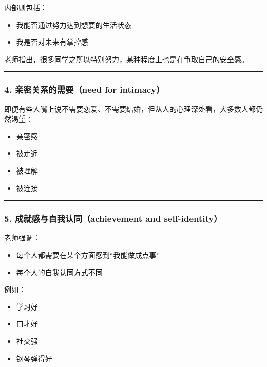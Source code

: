 \documentclass[
  chinese,
  9pt,
  a4paper,
]{ctexart}
\providecommand{\tightlist}{%
  \setlength{\itemsep}{0pt}\setlength{\parskip}{0pt}}
\begin{document}
内部则包括：

\begin{itemize}
\tightlist
\item
  我能否通过努力达到想要的生活状态
\item
  我是否对未来有掌控感
\end{itemize}

老师指出，很多同学之所以特别努力，某种程度上也是在争取自己的安全感。

\begin{center}\rule{0.5\linewidth}{0.5pt}\end{center}

\subsubsection{4. 亲密关系的需要（need for
intimacy）}\label{ux4eb2ux5bc6ux5173ux7cfbux7684ux9700ux8981need-for-intimacy}

即便有些人嘴上说不需要恋爱、不需要结婚，但从人的心理深处看，大多数人都仍然渴望：

\begin{itemize}
\tightlist
\item
  亲密感
\item
  被走近
\item
  被理解
\item
  被连接
\end{itemize}

\begin{center}\rule{0.5\linewidth}{0.5pt}\end{center}

\subsubsection{5. 成就感与自我认同（achievement and
self-identity）}\label{ux6210ux5c31ux611fux4e0eux81eaux6211ux8ba4ux540cachievement-and-self-identity}

老师强调：

\begin{itemize}
\tightlist
\item
  每个人都需要在某个方面感到``我能做成点事''
\item
  每个人的自我认同方式不同
\end{itemize}

例如：

\begin{itemize}
\tightlist
\item
  学习好
\item
  口才好
\item
  社交强
\item
  钢琴弹得好
\end{itemize}
\end{document}
